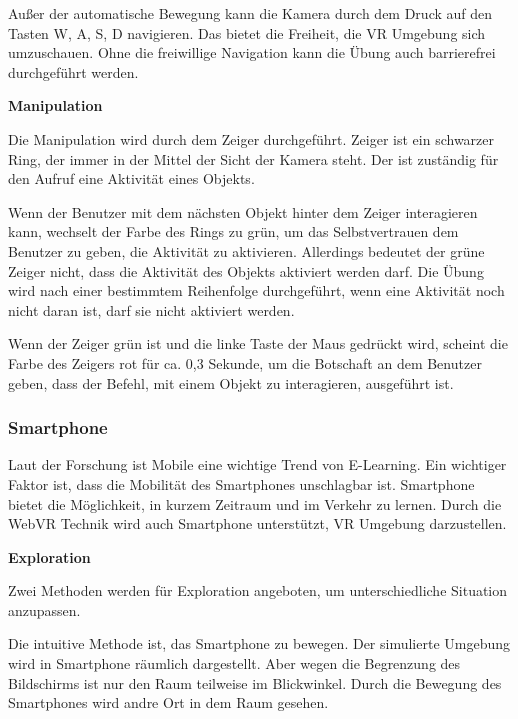  Außer der automatische Bewegung kann die Kamera durch dem Druck auf den Tasten W, A, S, D navigieren. Das bietet die Freiheit, die VR Umgebung sich umzuschauen. Ohne die freiwillige Navigation kann die Übung auch barrierefrei durchgeführt werden.
  
  \textbf{Manipulation}
  
  Die Manipulation wird durch dem Zeiger durchgeführt. Zeiger ist ein schwarzer Ring, der immer in der Mittel der Sicht der Kamera steht. Der ist zuständig für den Aufruf eine Aktivität eines Objekts.
  
  Wenn der Benutzer mit dem nächsten Objekt hinter dem Zeiger interagieren kann, wechselt der Farbe des Rings zu grün, um das Selbstvertrauen dem Benutzer zu geben, die Aktivität zu aktivieren. Allerdings bedeutet der grüne Zeiger nicht, dass die Aktivität des Objekts aktiviert werden darf. Die Übung wird nach einer bestimmtem Reihenfolge durchgeführt, wenn eine Aktivität noch nicht daran ist, darf sie nicht aktiviert werden.
  
  Wenn der Zeiger grün ist und die linke Taste der Maus gedrückt wird, scheint die Farbe des Zeigers rot für ca. 0,3 Sekunde, um die Botschaft an dem Benutzer geben, dass der Befehl, mit einem Objekt zu interagieren, ausgeführt ist. 
  
 \subsubsection{Smartphone}
 Laut der Forschung ist Mobile eine wichtige Trend von E-Learning. Ein wichtiger Faktor ist, dass die Mobilität des Smartphones unschlagbar ist. Smartphone bietet die Möglichkeit, in kurzem Zeitraum und im Verkehr zu lernen. Durch die WebVR Technik wird auch Smartphone unterstützt, VR Umgebung darzustellen.
 
  \textbf{Exploration}
  
  Zwei Methoden werden für Exploration angeboten, um unterschiedliche Situation anzupassen.
  
  Die intuitive Methode ist, das Smartphone zu bewegen. Der simulierte Umgebung wird in Smartphone räumlich dargestellt. Aber wegen die Begrenzung des Bildschirms ist nur den Raum teilweise im Blickwinkel. Durch die Bewegung des Smartphones wird andre Ort in dem Raum gesehen.

